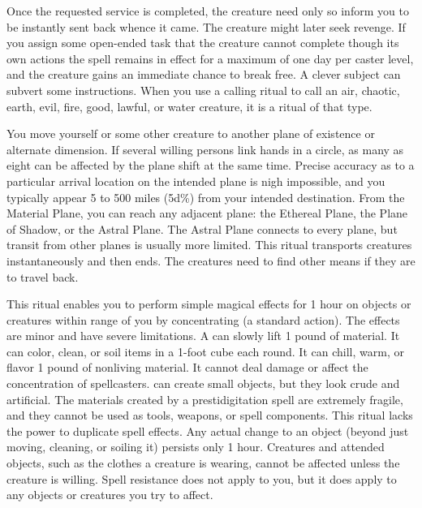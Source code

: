 \par Once the requested service is completed, the creature need only so inform you to be instantly sent back whence it came. The creature might later seek revenge. If you assign some open-ended task that the creature cannot complete though its own actions the spell remains in effect for a maximum of one day per caster level, and the creature gains an immediate chance to break free.
\spellnotes A clever subject can subvert some instructions. When you use a calling ritual to call an air, chaotic, earth, evil, fire, good, lawful, or water creature, it is a ritual of that type.

\spelleffect You move yourself or some other creature to another plane of existence or alternate dimension. If several willing persons link hands in a circle, as many as eight can be affected by the plane shift at the same time. Precise accuracy as to a particular arrival location on the intended plane is nigh impossible, and you typically appear 5 to 500 miles (5d\%) from your intended destination. From the Material Plane, you can reach any adjacent plane: the Ethereal Plane, the Plane of Shadow, or the Astral Plane. The Astral Plane connects to every plane, but transit from other planes is usually more limited.
\spellnotes This ritual transports creatures instantaneously and then ends. The creatures need to find other means if they are to travel back.

\spelleffect This ritual enables you to perform simple magical effects for 1 hour on objects or creatures within \rngclose range of you by concentrating (a standard action). The effects are minor and have severe limitations. A  can slowly lift 1 pound of material. It can color, clean, or soil items in a 1-foot cube each round. It can chill, warm, or flavor 1 pound of nonliving material. It cannot deal damage or affect the concentration of spellcasters.  can create small objects, but they look crude and artificial. The materials created by a prestidigitation spell are extremely fragile, and they cannot be used as tools, weapons, or spell components.
\spellnotes This ritual lacks the power to duplicate spell effects. Any actual change to an object (beyond just moving, cleaning, or soiling it) persists only 1 hour. Creatures and attended objects, such as the clothes a creature is wearing, cannot be affected unless the creature is willing. Spell resistance does not apply to you, but it does apply to any objects or creatures you try to affect.

